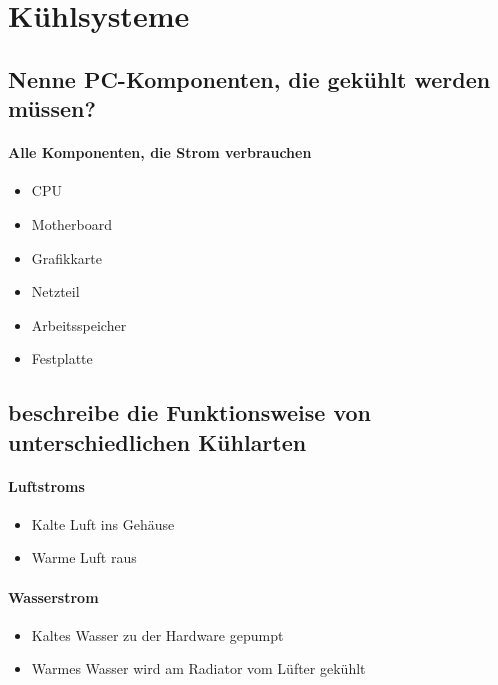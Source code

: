 \documentclass[a4paper]{article}
\begin{document}
    \section{Kühlsysteme}\label{sec:kuehlsysteme}

    \subsection{\color{red}Nenne PC-Komponenten, die gekühlt werden müssen?}\label{subsec:color{red}nenne-pc-komponenten-die-gekühlt-werden-müssen?}

    \paragraph{\color{codegreen}Alle Komponenten, die Strom verbrauchen}
    \begin{itemize}
        \color{magenta}
        \item CPU
        \item Motherboard
        \item Grafikkarte
        \item Netzteil
        \item Arbeitsspeicher
        \item Festplatte
    \end{itemize}

    \subsection{\color{red}beschreibe die Funktionsweise von unterschiedlichen Kühlarten}\label{subsec:color{red}beschreibe-die-funktionsweise-von-unterschiedlichen-kühlarten}

    \paragraph{\color{codegreen}Luftstroms}
    \begin{itemize}
        \color{magenta}
        \item Kalte Luft ins Gehäuse
        \item Warme Luft raus
    \end{itemize}

    \paragraph{\color{codegreen}Wasserstrom}
    \begin{itemize}
        \color{magenta}
        \item  Kaltes Wasser zu der Hardware gepumpt
        \item Warmes Wasser wird am Radiator vom Lüfter gekühlt
    \end{itemize}
\end{document}
